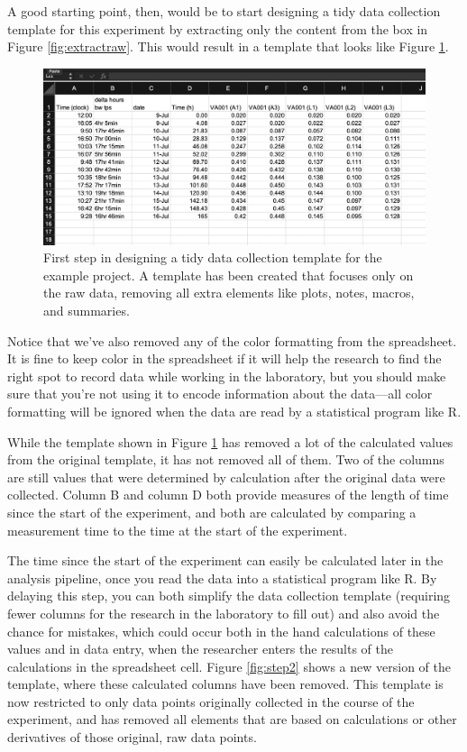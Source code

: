 \documentclass[]{tufte-book}
\begin{document}
A good starting point, then, would be to start designing a tidy data collection
template for this experiment by extracting only the content from the box in
Figure \ref{fig:extractraw}. This would result in a template that looks like
Figure \ref{fig:step1}.

\begin{figure}
\includegraphics[width=\textwidth]{figures/growth_curve_step1} \caption[First step in designing a tidy data collection template for the example project]{First step in designing a tidy data collection template for the example project. A template has been created that focuses only on the raw data, removing all extra elements like plots, notes, macros, and summaries.}\label{fig:step1}
\end{figure}

Notice that we've also removed any of the color formatting from the spreadsheet. It is fine to
keep color in the spreadsheet if it will help the research to find the right spot to record data
while working in the laboratory, but you should make sure that you're not using it to encode
information about the data---all color formatting will be ignored when the data are read by a
statistical program like R.

While the template shown in Figure \ref{fig:step1} has removed a lot of the calculated values from the
original template, it has not removed all of them. Two of the columns are still values that were
determined by calculation after the original data were collected. Column B and column D both provide
measures of the length of time since the start of the experiment, and both are calculated by
comparing a measurement time to the time at the start of the experiment.

The time since the start of the experiment can easily be calculated later in the analysis pipeline,
once you read the data into a statistical program like R. By delaying this step, you can both
simplify the data collection template (requiring fewer columns for the research in the laboratory
to fill out) and also avoid the chance for mistakes, which could occur both in the hand calculations
of these values and in data entry, when the researcher enters the results of the calculations in the
spreadsheet cell. Figure \ref{fig:step2} shows a new version of the template, where these calculated
columns have been removed. This template is now restricted to only data points originally collected
in the course of the experiment, and has removed all elements that are based on calculations or other
derivatives of those original, raw data points.
\end{document}
